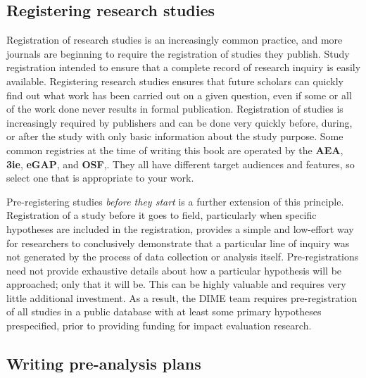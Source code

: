 \subsection{Registering research studies}

Registration of research studies is an increasingly common practice,
and more journals are beginning to require
the registration of studies they publish.\cite{vilhuber2020report}
Study registration intended to ensure that a complete record of research inquiry is easily available.
Registering research studies ensures that future scholars can quickly
find out what work has been carried out on a given question,
even if some or all of the work done never results in formal publication.
Registration of studies is increasingly required by publishers
and can be done very quickly before, during, or after the study
with only basic information about the study purpose.
Some common registries at the time of writing this book are operated by the \textbf{AEA},
\textbf{3ie},
\textbf{eGAP},
and \textbf{OSF},.
They all have different target audiences and features,
so select one that is appropriate to your work.

Pre-registering studies \textit{before they start} is a further extension of this principle.\cite{nosek2018preregistration}
Registration of a study before it goes to field,
particularly when specific hypotheses are included in the registration,
provides a simple and low-effort way for researchers
to conclusively demonstrate that a particular line of inquiry
was not generated by the process of data collection or analysis itself.
Pre-registrations need not provide exhaustive details about how
a particular hypothesis will be approached; only that it will be.
This can be highly valuable and requires very little additional investment.
As a result, the DIME team requires pre-registration of all studies
in a public database with at least some primary hypotheses prespecified,
prior to providing funding for impact evaluation research.

\subsection{Writing pre-analysis plans}

